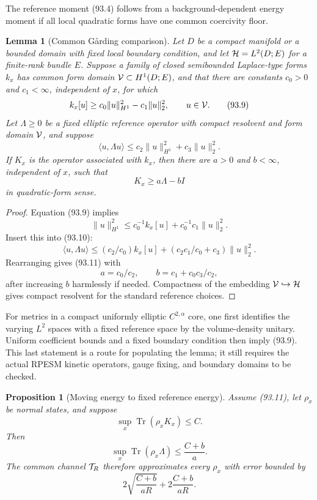 \documentclass[11pt]{article}
\newtheorem{proposition}[theorem]{Proposition}
\newtheorem{lemma}[theorem]{Lemma}
\theoremstyle{remark}
\begin{document}
The reference moment (93.4) follows from a background-dependent
energy moment if all local quadratic forms have one common
coercivity floor.

\begin{lemma}[Common G{\aa}rding comparison]
\label{lem:v12v93-garding}
Let \(D\) be a compact manifold or a bounded domain with fixed local
boundary condition, and let \({\cal H}=L^2(D;E)\) for a
finite-rank bundle \(E\).  Suppose a family of closed
semibounded Laplace-type forms \(k_x\) has common form domain
\({\cal V}\subset H^1(D;E)\), and that there are constants
\(c_0>0\) and \(c_1<\infty\), independent of \(x\), for which
\[
 k_x[u]\geq c_0\|u\|_{H^1}^2-c_1\|u\|_2^2,
 \qquad u\in{\cal V}.                                            \tag{93.9}
\]
Let \(\Lambda\geq0\) be a fixed elliptic reference operator with
compact resolvent and form domain \({\cal V}\), and suppose
\[
 \langle u,\Lambda u\rangle
 \leq c_2\|u\|_{H^1}^2+c_3\|u\|_2^2.                            \tag{93.10}
\]
If \(K_x\) is the operator associated with \(k_x\), then there are
\(a>0\) and \(b<\infty\), independent of \(x\), such that
\[
 K_x\geq a\Lambda-bI                                             \tag{93.11}
\]
in quadratic-form sense.
\end{lemma}

\begin{proof}
Equation (93.9) implies
\[
 \|u\|_{H^1}^2
 \leq c_0^{-1}k_x[u]+c_0^{-1}c_1\|u\|_2^2.                      \tag{93.12}
\]
Insert this into (93.10):
\[
 \langle u,\Lambda u\rangle
 \leq(c_2/c_0)k_x[u]
   +(c_2c_1/c_0+c_3)\|u\|_2^2.                                  \tag{93.13}
\]
Rearranging gives (93.11) with
\[
 a=c_0/c_2,\qquad b=c_1+c_0c_3/c_2,                              \tag{93.14}
\]
after increasing \(b\) harmlessly if needed.  Compactness of the
embedding \({\cal V}\hookrightarrow{\cal H}\) gives compact
resolvent for the standard reference choices.
\end{proof}

For metrics in a compact uniformly elliptic \(C^{2,\alpha}\) core,
one first identifies the varying \(L^2\) spaces with a fixed
reference space by the volume-density unitary.  Uniform coefficient
bounds and a fixed boundary condition then imply (93.9).  This last
statement is a route for populating the lemma; it still requires the
actual RPESM kinetic operators, gauge fixing, and boundary domains
to be checked.

\begin{proposition}[Moving energy to fixed reference energy]
\label{prop:v12v93-transfer}
Assume (93.11), let \(\rho_x\) be normal states, and suppose
\[
 \sup_x\operatorname{Tr}(\rho_xK_x)\leq C.                       \tag{93.15}
\]
Then
\[
 \sup_x\operatorname{Tr}(\rho_x\Lambda)
 \leq\frac{C+b}{a}.                                              \tag{93.16}
\]
The common channel \({\cal T}_R\) therefore approximates every
\(\rho_x\) with error bounded by
\[
 2\sqrt{\frac{C+b}{aR}}+
 2\frac{C+b}{aR}.                                                \tag{93.17}
\]
\end{proposition}
\end{document}
